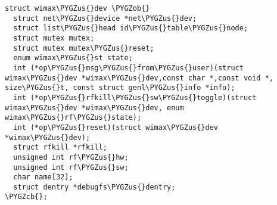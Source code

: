 \documentclass[a4paper,8pt,english]{sphinxmanual}
\def\PYGZus{\char`\_}
\def\PYGZob{\char`\{}
\def\PYGZcb{\char`\}}
\begin{document}
\begin{Verbatim}[commandchars=\\\{\}]
struct wimax\PYGZus{}dev \PYGZob{}
  struct net\PYGZus{}device *net\PYGZus{}dev;
  struct list\PYGZus{}head id\PYGZus{}table\PYGZus{}node;
  struct mutex mutex;
  struct mutex mutex\PYGZus{}reset;
  enum wimax\PYGZus{}st state;
  int (*op\PYGZus{}msg\PYGZus{}from\PYGZus{}user)(struct wimax\PYGZus{}dev *wimax\PYGZus{}dev,const char *,const void *, size\PYGZus{}t, const struct genl\PYGZus{}info *info);
  int (*op\PYGZus{}rfkill\PYGZus{}sw\PYGZus{}toggle)(struct wimax\PYGZus{}dev *wimax\PYGZus{}dev, enum wimax\PYGZus{}rf\PYGZus{}state);
  int (*op\PYGZus{}reset)(struct wimax\PYGZus{}dev *wimax\PYGZus{}dev);
  struct rfkill *rfkill;
  unsigned int rf\PYGZus{}hw;
  unsigned int rf\PYGZus{}sw;
  char name[32];
  struct dentry *debugfs\PYGZus{}dentry;
\PYGZcb{};
\end{Verbatim}
\end{document}
